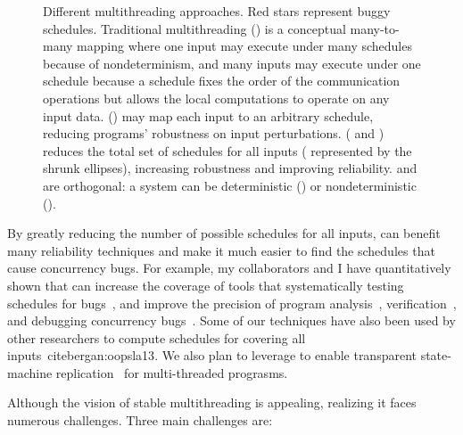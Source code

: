 \begin{figure}[t]
\begin{center}
\caption{Different multithreading approaches. Red stars represent buggy
  schedules.  Traditional multithreading ()
  is a conceptual many-to-many mapping where one input may execute under
  many schedules because of nondeterminism, and many inputs may execute
  under one schedule because a schedule fixes the order of the
  communication operations but allows the local computations to operate on
  any input data.  \dmt () may
  map each input to an arbitrary schedule, reducing programs' robustness
  on input perturbations.  \smt ( and
  ) reduces the total set of schedules for all inputs (
represented by the shrunk ellipses),
  increasing robustness and improving reliability.
  \smt and \dmt are orthogonal: a \smt system can be deterministic
  () or nondeterministic ().}
\vspace{-.2in}
\end{center}
\end{figure}


By greatly reducing the number of possible schedules for all inputs, \smt can benefit many reliability 
techniques and make it much easier to find the schedules that cause concurrency 
bugs. For example, my collaborators and I have quantitatively shown that \smt can 
increase the coverage of tools that systematically testing schedules for 
bugs~\cite{parrot:sosp13, dbug:spin11, modist:nsdi09}, and improve the precision 
of program analysis~\cite{wu:pldi12}, verification~\cite{wu:pldi12}, and 
debugging concurrency bugs~\cite{cui:tern:osdi10}. Some of our \smt techniques have 
also been used by other researchers to compute schedules for covering all 
inputs~cite{bergan:oopsla13}. We also plan to leverage \smt to enable transparent 
state-machine replication~\cite{paxos} for multi-threaded prograsms.

Although the vision of stable multithreading is appealing, realizing it
faces numerous challenges.  Three main challenges are:

